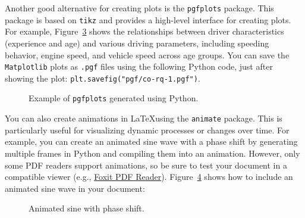 Another good alternative for creating plots is the \texttt{pgfplots} package. This package is based on \texttt{tikz} and provides a high-level interface for creating plots. For example, Figure~\ref{fig:correlation-analysis} shows the relationships between driver characteristics (experience and age) and various driving parameters, including speeding behavior, engine speed, and vehicle speed across age groups. You can save the \texttt{Matplotlib} plots as \texttt{.pgf} files using the following Python code, just after showing the plot: \texttt{plt.savefig("pgf/co-rq-1.pgf")}.
\begin{figure}[!ht]
    \centering
    \begin{subfigure}[b]{0.49\textwidth}
        \caption{}
        \label{fig:correlation-analysis-a}
        \resizebox{\textwidth}{!}{%
            
        }
    \end{subfigure}
    \begin{subfigure}[b]{0.49\textwidth}
        \caption{}
        \label{fig:correlation-analysis-c}
        \resizebox{\textwidth}{!}{%
            
        }
    \end{subfigure}
    \caption{Example of \texttt{pgfplots} generated using Python.}
    \label{fig:correlation-analysis}
\end{figure}

You can also create animations in \LaTeX using the \texttt{animate} package. This is particularly useful for visualizing dynamic processes or changes over time. For example, you can create an animated sine wave with a phase shift by generating multiple frames in Python and compiling them into an animation. However, only some PDF readers support animations, so be sure to test your document in a compatible viewer (e.g., \href{https://www.foxit.com/pdf-reader}{Foxit PDF Reader}). Figure~\ref{fig:sine-anim} shows how to include an animated sine wave in your document:
\begin{figure}[h]
    \centering
    \caption{Animated sine with phase shift.}
    \label{fig:sine-anim}
\end{figure}

